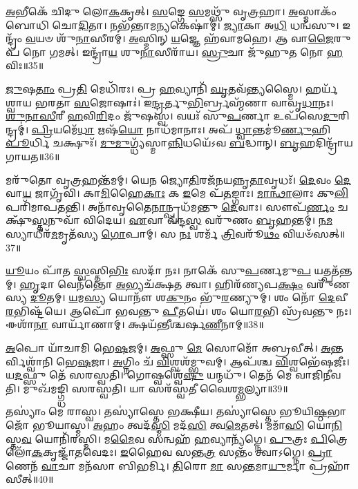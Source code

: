 \-\ul{𑌅}\-𑌭𑍀𑌕𑍇᳴ 𑌚𑌿𑌦𑍁 𑌲𑍋\-\ul{𑌕}\-𑌕𑍃𑌤𑍍।
\-\ul{𑌸}\-𑌙𑍍𑌗𑍇 \ul{𑌸}\-𑌮𑌥𑍍𑌸𑍁᳴ 𑌵𑍃\-\ul{𑌤𑍍𑌰}\-𑌹𑌾।
\-\ul{𑌅}\-𑌸𑍍𑌮𑌾𑌕𑌂᳴ 𑌬𑍋𑌧𑌿 𑌚𑍋\-\ul{𑌦𑌿}\-𑌤𑌾।
𑌨𑌭᳴𑌨𑍍𑌤𑌾𑌮\-\ul{𑌨𑍍𑌯}\-𑌕𑍇𑌷𑌾॑𑌮𑍍।
\-\ul{𑌜𑍍𑌯𑌾}\-𑌕𑌾 𑌅\-\ul{𑌧𑌿} 𑌧𑌨𑍍𑌵᳴𑌸𑍁।
𑌇𑌨𑍍𑌦𑍍𑌰𑌂᳴ \ul{𑌵}\-𑌯𑍞 𑌶𑍁᳴\-\ul{𑌨𑌾}\-𑌸𑍀𑌰𑌮𑍍॑।
\-\ul{𑌅}\-𑌸𑍍𑌮𑌿𑌨𑍍 \ul{𑌯}\-𑌜𑍍𑌞𑍇 𑌹᳴𑌵𑌾𑌮𑌹𑍇।
𑌆 𑌵𑌾\-\ul{𑌜𑍈}\-𑌰𑍁𑌪᳴ 𑌨𑍋 𑌗𑌮𑌤𑍍।
𑌇𑌨𑍍𑌦𑍍𑌰𑌾᳴\-\ul{𑌯} 𑌶𑍁\-\ul{𑌨𑌾}\-𑌸𑍀𑌰𑌾᳴𑌯।
\-\ul{𑌸𑍍𑌰𑍁}\-𑌚𑌾 𑌜𑍁᳴𑌹𑍁𑌤 𑌨𑍋 \ul{𑌹}\-𑌵𑌿𑌃॥35॥

\-\ul{𑌜𑍁}\-𑌷\-\ul{𑌤𑌾𑌂} 𑌪𑍍𑌰\-\ul{𑌤𑌿} 𑌮𑍇𑌧𑌿᳴𑌰𑌃।
𑌪𑍍𑌰 \ul{𑌹}\-𑌵𑍍𑌯𑌾𑌨𑌿᳴ \ul{𑌘𑍃}\-𑌤𑌵᳴𑌨𑍍𑌤𑍍𑌯𑌸𑍍𑌮𑍈।
𑌹𑌰𑍍𑌯᳴𑌶𑍍𑌵𑌾𑌯 𑌭𑌰𑌤𑌾 \ul{𑌸}\-𑌜𑍋𑌷𑌾𑌃॑।
𑌇\-\ul{𑌨𑍍𑌦𑍍𑌰}\-𑌰𑍍𑌤𑍁\-\ul{𑌭𑌿}\-𑌰𑍍𑌬𑍍𑌰𑌹𑍍𑌮᳴𑌣𑌾 𑌵𑌾𑌵𑍃\-\ul{𑌧𑌾}\-𑌨𑌃।
\-\ul{𑌶𑍁}\-\-\ul{𑌨𑌾}\-\-\ul{𑌸𑍀}\-𑌰𑍀 \ul{𑌹}\-𑌵𑌿\-\ul{𑌰𑌿}\-𑌦𑌂 𑌜𑍁᳴𑌷𑌸𑍍𑌵।
𑌵𑌯𑌃᳴ 𑌸𑍁\-\ul{𑌪}\-𑌰𑍍𑌣𑌾 𑌉𑌪᳴𑌸𑍇\-\ul{𑌦𑍁}\-𑌰𑌿𑌨𑍍𑌦𑍍𑌰𑌮𑍍॑।
\-\ul{𑌪𑍍𑌰𑌿}\-𑌯𑌮𑍇᳴\-\ul{𑌧𑌾} 𑌋𑌷᳴\-\ul{𑌯𑍋} 𑌨𑌾𑌧᳴𑌮𑌾𑌨𑌾𑌃।
𑌅𑌪᳴ \ul{𑌧𑍍𑌵𑌾}\-𑌨𑍍𑌤𑌮𑍂॑\-\ul{𑌰𑍍𑌣𑍁}\-𑌹𑌿 \ul{𑌪𑍂}\-𑌰𑍍𑌧𑌿 𑌚𑌕𑍍𑌷𑍁𑌃᳴।
\-\ul{𑌮𑍁}\-\-\ul{𑌮𑍁}\-𑌗𑍍𑌧𑍍𑌯᳴𑌸𑍍𑌮𑌾\-\ul{𑌨𑍍𑌨𑌿}\-𑌧𑌯𑍇᳴𑌽𑌵 \ul{𑌬}\-𑌦𑍍𑌧𑌾𑌨𑍍।
\-\ul{𑌬𑍃}\-𑌹𑌦𑌿𑌨𑍍𑌦𑍍𑌰𑌾᳴𑌯 𑌗𑌾𑌯𑌤॥36॥

𑌮𑌰𑍁᳴𑌤𑍋 𑌵𑍃\-\ul{𑌤𑍍𑌰}\-𑌹𑌨𑍍𑌤᳴𑌮𑌮𑍍।
𑌯𑍇\-\ul{𑌨} 𑌜𑍍𑌯𑍋\-\ul{𑌤𑌿}\-𑌰𑌜᳴𑌨𑌯𑌨𑍍𑌨𑍃\-\ul{𑌤𑌾}\-𑌵𑍃𑌧𑌃᳴।
\-\ul{𑌦𑍇}\-𑌵𑌂 \ul{𑌦𑍇}\-𑌵𑌾\-\ul{𑌯} 𑌜𑌾𑌗𑍃᳴𑌵𑌿।
𑌕𑌾\-\ul{𑌮𑌿}\-𑌹𑍈\-\ul{𑌕𑌾𑌃} 𑌕 \ul{𑌇}\-𑌮𑍇 𑌪᳴\-\ul{𑌤}\-𑌙𑍍𑌗𑌾𑌃।
\-\ul{𑌮𑌾}\-\-\ul{𑌨𑍍𑌥𑌾}\-𑌲𑌾𑌃 𑌕𑍁\-\ul{𑌲𑌿}\-𑌪𑌰𑌿᳴𑌮𑌾𑌪𑌤𑌨𑍍𑌤𑌿।
𑌅𑌨𑌾᳴𑌵𑍃𑌤𑍈\-\ul{𑌨𑌾}\-𑌨𑍍𑌪𑍍𑌰𑌧᳴𑌮𑌨𑍍𑌤𑍁 \ul{𑌦𑍇}\-𑌵𑌾𑌃।
𑌸𑍗𑌪᳴\-\ul{𑌰𑍍𑌣𑌂} 𑌚𑌕𑍍𑌷𑍁᳴\-\ul{𑌸𑍍𑌤}\-𑌨𑍁𑌵𑌾᳴ 𑌵𑌿𑌦𑍇𑌯।
\-\ul{𑌏}\-𑌵𑌾 𑌵᳴𑌨𑍍𑌦\-\ul{𑌸𑍍𑌵} 𑌵𑌰𑍁᳴𑌣𑌂 \ul{𑌬𑍃}\-𑌹𑌨𑍍𑌤𑌮𑍍॑।
\-\ul{𑌨}\-\-\ul{𑌮}\-𑌸𑍍𑌯𑌾𑌧𑍀𑌰᳴\-\ul{𑌮}\-𑌮𑍃𑌤᳴𑌸𑍍𑌯 \ul{𑌗𑍋}\-𑌪𑌾𑌮𑍍।
𑌸 \ul{𑌨𑌃} 𑌶𑌰𑍍𑌮᳴ \ul{𑌤𑍍𑌰𑌿}\-𑌵𑌰𑍂᳴\-\ul{𑌥𑌂} 𑌵𑌿𑌯𑍞᳴𑌸𑌤𑍍॥37॥

\-\ul{𑌯𑍂}\-𑌯𑌂 𑌪𑌾᳴𑌤 \ul{𑌸𑍍𑌵}\-𑌸𑍍𑌤𑌿\-\ul{𑌭𑌿𑌃} 𑌸𑌦𑌾᳴ 𑌨𑌃।
𑌨𑌾𑌕𑍇᳴ 𑌸𑍁\-\ul{𑌪}\-𑌰𑍍𑌣𑌮𑍁\-\ul{𑌪} 𑌯𑌤𑍍𑌪𑌤᳴𑌨𑍍𑌤𑌮𑍍।
\-\ul{𑌹𑍃}\-𑌦𑌾 𑌵𑍇𑌨᳴𑌨𑍍𑌤𑍋 \ul{𑌅}\-𑌭𑍍𑌯𑌚᳴𑌕𑍍𑌷𑌤 𑌤𑍍𑌵𑌾।
𑌹𑌿𑌰᳴𑌣𑍍𑌯𑌪\-\ul{𑌕𑍍𑌷𑌂} 𑌵𑌰𑍁᳴𑌣𑌸𑍍𑌯 \ul{𑌦𑍂}\-𑌤𑌮𑍍।
\-\ul{𑌯}\-𑌮\-\ul{𑌸𑍍𑌯} 𑌯𑍋𑌨𑍗᳴ 𑌶\-\ul{𑌕𑍁}\-𑌨𑌂 𑌭𑍁᳴\-\ul{𑌰}\-𑌣𑍍𑌯𑍁𑌮𑍍।
𑌶𑌂 𑌨𑍋᳴ \ul{𑌦𑍇}\-𑌵𑍀\-\ul{𑌰}\-𑌭𑌿𑌷𑍍𑌟᳴𑌯𑍇।
𑌆𑌪𑍋᳴ 𑌭𑌵𑌨𑍍𑌤𑍁 \ul{𑌪𑍀}\-𑌤𑌯𑍇॑।
𑌶𑌂 𑌯𑍋\-\ul{𑌰}\-𑌭𑌿 𑌸𑍍𑌰᳴𑌵𑌨𑍍𑌤𑍁 𑌨𑌃।
𑌈𑌶𑌾᳴\-\ul{𑌨𑌾} 𑌵𑌾𑌰𑍍𑌯𑌾᳴𑌣𑌾𑌮𑍍।
𑌕𑍍𑌷𑌯᳴𑌨𑍍𑌤𑍀𑌶𑍍𑌚𑌰𑍍\mbox{}𑌷\-\ul{𑌣𑍀}\-𑌨𑌾𑌮𑍍॥38॥

\-\ul{𑌅}\-𑌪𑍋 𑌯𑌾᳴𑌚𑌾𑌮𑌿 𑌭𑍇\-\ul{𑌷}\-𑌜𑌮𑍍।
\-\ul{𑌅}\-𑌫𑍍𑌸𑍁 \ul{𑌮𑍇} 𑌸𑍋𑌮𑍋᳴ 𑌅𑌬𑍍𑌰𑌵𑍀𑌤𑍍।
\-\ul{𑌅}\-𑌨𑍍𑌤𑌰𑍍𑌵𑌿𑌶𑍍𑌵𑌾᳴𑌨𑌿 𑌭𑍇\-\ul{𑌷}\-𑌜𑌾।
\-\ul{𑌅}\-𑌗𑍍𑌨𑌿𑌂 𑌚᳴ \ul{𑌵𑌿}\-𑌶𑍍𑌵𑌶᳴𑌮𑍍𑌭𑍁𑌵𑌮𑍍।
𑌆𑌪᳴𑌶𑍍𑌚 \ul{𑌵𑌿}\-𑌶𑍍𑌵𑌭𑍇᳴𑌷𑌜𑍀𑌃।
𑌯\-\ul{𑌦}\-𑌫𑍍𑌸𑍁 𑌤𑍇᳴ 𑌸𑌰𑌸𑍍𑌵𑌤𑌿।
𑌗𑍋𑌷𑍍𑌵𑌶𑍍𑌵𑍇᳴\-\ul{𑌷𑍁} 𑌯𑌨𑍍𑌮𑌧𑍁᳴।
𑌤𑍇𑌨᳴ 𑌮𑍇 𑌵𑌾𑌜𑌿𑌨𑍀𑌵𑌤𑌿।
𑌮𑍁𑌖᳴𑌮𑌙𑍍𑌗𑍍𑌧𑌿 𑌸𑌰𑌸𑍍𑌵𑌤𑌿।
𑌯𑌾 𑌸𑌰᳴𑌸𑍍𑌵𑌤𑍀 𑌵𑍈𑌶\-\ul{𑌮𑍍𑌭}\-𑌲𑍍𑌯𑌾॥39॥

𑌤𑌸𑍍𑌯𑌾𑌂॑ 𑌮𑍇 𑌰𑌾𑌸𑍍𑌵।
𑌤𑌸𑍍𑌯𑌾॑𑌸𑍍𑌤𑍇 𑌭𑌕𑍍𑌷𑍀𑌯।
𑌤𑌸𑍍𑌯𑌾॑𑌸𑍍𑌤𑍇 𑌭𑍂𑌯𑌿\-\ul{𑌷𑍍𑌠}\-𑌭𑌾𑌜𑍋᳴ 𑌭𑍂𑌯𑌾𑌸𑍍𑌮।
\-\ul{𑌅}\-𑌹𑌂 𑌤𑍍𑌵𑌦᳴\-\ul{𑌸𑍍𑌮𑌿} 𑌮𑌦᳴\-\ul{𑌸𑌿} 𑌤𑍍𑌵\-\ul{𑌮𑍇}\-𑌤𑌤𑍍।
𑌮𑌮𑌾᳴\-\ul{𑌸𑌿} 𑌯𑍋\-\ul{𑌨𑌿}\-𑌸𑍍𑌤\-\ul{𑌵} 𑌯𑍋𑌨𑌿᳴𑌰𑌸𑍍𑌮𑌿।
𑌮\-\ul{𑌮𑍈}\-𑌵 𑌸𑌨𑍍𑌵𑌹᳴ \ul{𑌹}\-𑌵𑍍𑌯𑌾𑌨𑍍𑌯᳴𑌗𑍍𑌨𑍇।
\-\ul{𑌪𑍁}\-𑌤𑍍𑌰𑌃 \ul{𑌪𑌿}\-𑌤𑍍𑌰𑍇 𑌲𑍋᳴\-\ul{𑌕}\-𑌕𑍃𑌜𑍍𑌜𑌾᳴𑌤𑌵𑍇𑌦𑌃।
\-\ul{𑌇}\-𑌹𑍈𑌵 𑌸𑌨𑍍𑌤\-\ul{𑌤𑍍𑌰} 𑌸𑌨𑍍𑌤𑌂᳴ 𑌤𑍍𑌵𑌾\-𑌽𑌗𑍍𑌨𑍇।
\-\ul{𑌪𑍍𑌰𑌾}\-𑌣𑍇𑌨᳴ \ul{𑌵𑌾}\-𑌚𑌾 𑌮𑌨᳴𑌸𑌾 𑌬𑌿𑌭𑌰𑍍𑌮𑌿।
\-\ul{𑌤𑌿}\-𑌰𑍋 \ul{𑌮𑌾} 𑌸\-\ul{𑌨𑍍𑌤}\-𑌮𑌾\-\ul{𑌯𑍁}\-𑌰𑍍𑌮𑌾 𑌪𑍍𑌰𑌹𑌾᳴𑌸𑍀𑌤𑍍॥40॥

